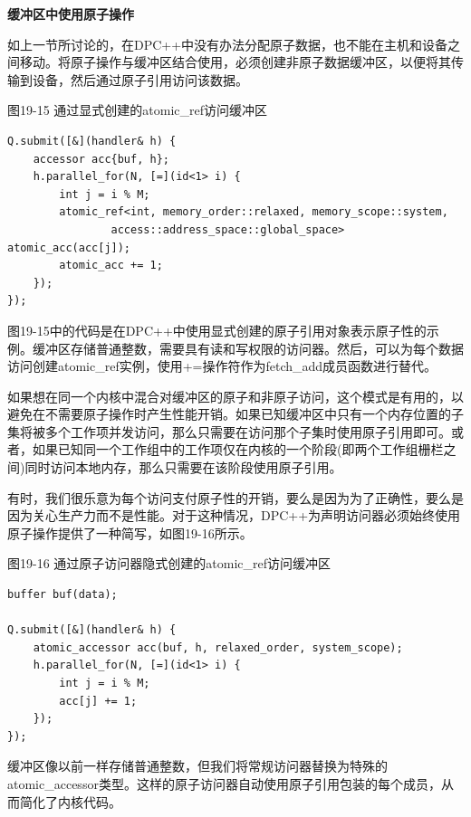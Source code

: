\hspace*{\fill} \par %
\textbf{缓冲区中使用原子操作}

如上一节所讨论的，在DPC++中没有办法分配原子数据，也不能在主机和设备之间移动。将原子操作与缓冲区结合使用，必须创建非原子数据缓冲区，以便将其传输到设备，然后通过原子引用访问该数据。\par

\hspace*{\fill} \par %
图19-15 通过显式创建的atomic\_ref访问缓冲区
\begin{lstlisting}[caption={}]
Q.submit([&](handler& h) {
	accessor acc{buf, h};
	h.parallel_for(N, [=](id<1> i) {
		int j = i % M;
		atomic_ref<int, memory_order::relaxed, memory_scope::system,
				access::address_space::global_space> atomic_acc(acc[j]);
		atomic_acc += 1;
	});
});
\end{lstlisting}

图19-15中的代码是在DPC++中使用显式创建的原子引用对象表示原子性的示例。缓冲区存储普通整数，需要具有读和写权限的访问器。然后，可以为每个数据访问创建atomic\_ref实例，使用+=操作符作为fetch\_add成员函数进行替代。\par

如果想在同一个内核中混合对缓冲区的原子和非原子访问，这个模式是有用的，以避免在不需要原子操作时产生性能开销。如果已知缓冲区中只有一个内存位置的子集将被多个工作项并发访问，那么只需要在访问那个子集时使用原子引用即可。或者，如果已知同一个工作组中的工作项仅在内核的一个阶段(即两个工作组栅栏之间)同时访问本地内存，那么只需要在该阶段使用原子引用。\par

有时，我们很乐意为每个访问支付原子性的开销，要么是因为为了正确性，要么是因为关心生产力而不是性能。对于这种情况，DPC++为声明访问器必须始终使用原子操作提供了一种简写，如图19-16所示。\par

\hspace*{\fill} \par %
图19-16 通过原子访问器隐式创建的atomic\_ref访问缓冲区
\begin{lstlisting}[caption={}]
buffer buf(data);

Q.submit([&](handler& h) {
	atomic_accessor acc(buf, h, relaxed_order, system_scope);
	h.parallel_for(N, [=](id<1> i) {
		int j = i % M;
		acc[j] += 1;
	});
});
\end{lstlisting}

缓冲区像以前一样存储普通整数，但我们将常规访问器替换为特殊的atomic\_accessor类型。这样的原子访问器自动使用原子引用包装的每个成员，从而简化了内核代码。\par

